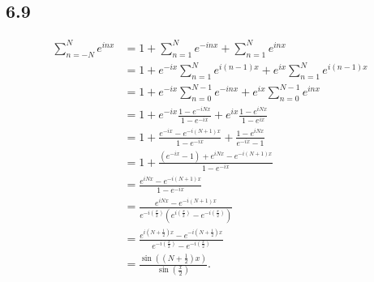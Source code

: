 \documentclass[10pt]{mypackage}
\begin{document}
\subsection{6.9}%
\begin{align*}
  \sum_{n=-N}^{N}e^{inx} &= 1 + \sum_{n=1}^{N}e^{-inx} + \sum_{n=1}^{N}e^{inx}\\
                         &= 1 + e^{-ix}\sum_{n=1}^{N}e^{i\left(n-1\right)x} + e^{ix}\sum_{n=1}^{N}e^{i\left(n-1\right)x}\\
                         &= 1 + e^{-ix}\sum_{n=0}^{N-1}e^{-inx} + e^{ix}\sum_{n=0}^{N-1}e^{inx}\\
                         &= 1 + e^{-ix}\frac{1 - e^{-iNx}}{1-e^{-ix}} + e^{ix}\frac{1-e^{iNx}}{1-e^{ix}}\\
                         &= 1 + \frac{e^{-ix} - e^{-i\left(N+1\right)x}}{1-e^{-ix}} + \frac{1-e^{iNx}}{e^{-ix} - 1}\\
                         &= 1 + \frac{\left(e^{-ix} - 1\right) + e^{iNx} - e^{-i\left(N+1\right)x}}{1-e^{-ix}}\\
                         &= \frac{e^{iNx} - e^{-i\left(N+1\right)x}}{1-e^{-ix}}\\
                         &= \frac{e^{iNx} - e^{-i\left(N+1\right)x}}{e^{-i\left(\frac{x}{2}\right)}\left(e^{i\left(\frac{x}{2}\right)} - e^{-i\left(\frac{x}{2}\right)}\right)}\\
                         &= \frac{e^{i\left(N + \frac{1}{2}\right)x} - e^{-i\left(N + \frac{1}{2}\right)x}}{e^{-i\left(\frac{x}{2}\right)} - e^{-i\left(\frac{x}{2}\right)}}\\
                         &= \frac{\sin\left(\left(N + \frac{1}{2}\right)x\right)}{\sin \left(\frac{x}{2}\right)}.
\end{align*}
\end{document}
